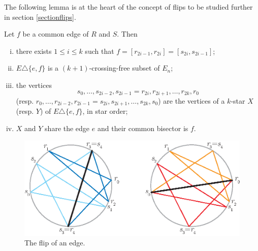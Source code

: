 \documentclass[12pt]{amsart}
\begin{document}
The following lemma is at the heart of the concept of flips to be studied further in section \ref{sectionflips}.

\begin{lemma}\label{commonedge}
Let $f$ be a common edge of $R$ and $S$. Then
\begin{enumerate}[(i)]
\item there exists $1\le i\le k$ such that $f=[r_{2i-1},r_{2i}]=[s_{2i},s_{2i-1}]$;
\item $E\triangle\{e,f\}$ is a $(k+1)$-crossing-free subset of $E_n$;
\item the vertices $$s_0,\ldots,s_{2i-2},s_{2i-1}=r_{2i},r_{2i+1},\ldots,r_{2k},r_0$$
(resp. $r_0,\ldots,r_{2i-2},r_{2i-1}=s_{2i},s_{2i+1},\ldots,s_{2k},s_0$) are the vertices of a $k$-star $X$ (resp. $Y$) of $E\triangle\{e,f\}$, in star order;
\item $X$ and $Y$ share the edge $e$ and their common bisector is $f$.
\end{enumerate}
\end{lemma}

\begin{figure}
\centerline{\includegraphics[scale=1]{flip.eps}}
\caption{\small{The flip of an edge.}}\label{flip}
\end{figure}
\end{document}
